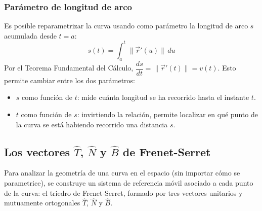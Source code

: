 \subsubsection{Parámetro de longitud de arco}

Es posible reparametrizar la curva usando como parámetro la longitud de arco $s$ acumulada desde $t = a$:
\[ s(t) = \int_a^t \|\vec{r}'(u)\|\, du \]
Por el Teorema Fundamental del Cálculo, $\dfrac{ds}{dt} = \|\vec{r}'(t)\| = v(t)$. Esto permite cambiar entre los dos parámetros:
\begin{itemize}
    \item $s$ como función de $t$: mide cuánta longitud se ha recorrido hasta el instante $t$.
    \item $t$ como función de $s$: invirtiendo la relación, permite localizar en qué punto de la curva se está habiendo recorrido una distancia $s$.
\end{itemize}

\subsection{Los vectores $\hat{T}$, $\hat{N}$ y $\hat{B}$ de Frenet-Serret}

Para analizar la geometría de una curva en el espacio (sin importar cómo se parametrice), se construye un sistema de referencia móvil asociado a cada punto de la curva: el triedro de Frenet-Serret, formado por tres vectores unitarios y mutuamente ortogonales $\hat{T}$, $\hat{N}$ y $\hat{B}$.

\begin{center}
\shorthandoff{>}
\end{center}

